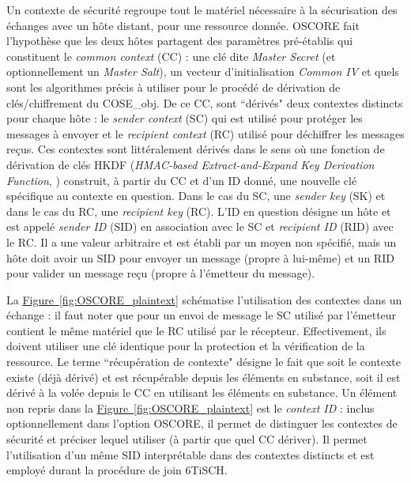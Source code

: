 \documentclass[]{report}
\newcommand{\wordlink}[2]{\hyperref[#2]{#1~\ref{#2}}}
\begin{document}
Un contexte de sécurité regroupe tout le matériel nécessaire à la sécurisation des échanges avec un hôte distant, pour une ressource donnée. OSCORE fait l'hypothèse que les deux hôtes partagent des paramètres pré-établis qui constituent le \textit{common context} (CC) : une clé dite \textit{Master Secret} (et optionnellement un \textit{Master Salt}), un vecteur d'initialisation \textit{Common IV} et quels sont les algorithmes précis à utiliser pour le procédé de dérivation de clés/chiffrement du COSE\_obj. De ce CC, sont ``dérivés" deux contextes distincts pour chaque hôte : le \textit{sender context} (SC) qui est utilisé pour protéger les messages à envoyer et le \textit{recipient context} (RC) utilisé pour déchiffrer les messages reçus. Ces contextes sont littéralement dérivés dans le sens où une fonction de dérivation de clés HKDF (\textit{HMAC-based Extract-and-Expand Key Derivation Function}, \cite{rfc5869}) construit, à partir du CC et d'un ID donné, une nouvelle clé spécifique au contexte en question. Dans le cas du SC, une \textit{sender key} (SK) et dans le cas du RC, une \textit{recipient key} (RC). L'ID en question désigne un hôte et est appelé \textit{sender ID} (SID) en association avec le SC et \textit{recipient ID} (RID) avec le RC. Il a une valeur arbitraire et est établi par un moyen non spécifié, mais un hôte doit avoir un SID pour envoyer un message (propre à lui-même) et un  RID pour valider un message reçu (propre à l'émetteur du message).\\

\par La \wordlink{Figure}{fig:OSCORE_plaintext} schématise l'utilisation des contextes dans un échange : il faut noter que pour un envoi de message le SC utilisé par l'émetteur contient le même matériel que le RC utilisé par le récepteur. Effectivement, ils doivent utiliser une clé identique pour la protection et la vérification de la ressource. Le terme ``récupération de contexte" désigne le fait que soit le contexte existe (déjà dérivé) et est récupérable depuis les éléments en substance, soit il est dérivé à la volée depuis le CC en utilisant les éléments en substance. Un élément non repris dans la \wordlink{Figure}{fig:OSCORE_plaintext} est le \textit{context ID} : inclus optionnellement dans l'option OSCORE, il permet de distinguer les contextes de sécurité et préciser lequel utiliser (à partir que quel CC dériver). Il permet l'utilisation d'un même SID interprétable dans des contextes distincts et est employé durant la procédure de join 6TiSCH. 
\vspace{0.4cm}
\end{document}
